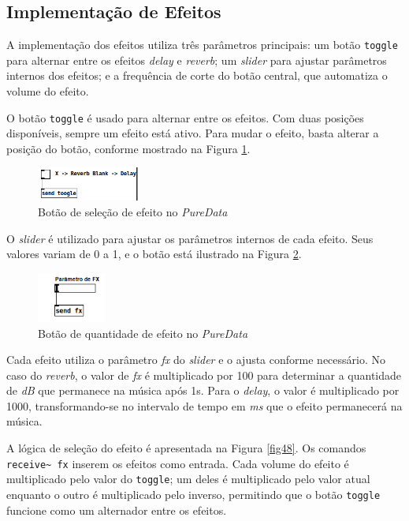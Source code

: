 \subsection{Implementação de Efeitos}

A implementação dos efeitos utiliza três parâmetros principais: um botão \texttt{toggle} para alternar entre os efeitos \textit{delay} e \textit{reverb}; um \textit{slider} para ajustar parâmetros internos dos efeitos; e a frequência de corte do botão central, que automatiza o volume do efeito.

O botão \texttt{toggle} é usado para alternar entre os efeitos. Com duas posições disponíveis, sempre um efeito está ativo. Para mudar o efeito, basta alterar a posição do botão, conforme mostrado na Figura \ref{fig46}.

\begin{figure}[h]
    \centering
    \includegraphics[width=0.3\textwidth]{figuras/fig46.png}
    \caption{Botão de seleção de efeito no \textit{PureData}}
    \label{fig46}
\end{figure}

O \textit{slider} é utilizado para ajustar os parâmetros internos de cada efeito. Seus valores variam de 0 a 1, e o botão está ilustrado na Figura \ref{fig47}.

\begin{figure}[h]
    \centering
    \includegraphics[width=0.2\textwidth]{figuras/fig47.png}
    \caption{Botão de quantidade de efeito no \textit{PureData}}
    \label{fig47}
\end{figure}

Cada efeito utiliza o parâmetro \textit{fx} do \textit{slider} e o ajusta conforme necessário. No caso do \textit{reverb}, o valor de \textit{fx} é multiplicado por 100 para determinar a quantidade de \textit{dB} que permanece na música após 1s. Para o \textit{delay}, o valor é multiplicado por 1000, transformando-se no intervalo de tempo em \textit{ms} que o efeito permanecerá na música.

A lógica de seleção do efeito é apresentada na Figura \ref{fig48}. Os comandos \texttt{receive\textasciitilde\ fx} inserem os efeitos como entrada. Cada volume do efeito é multiplicado pelo valor do \texttt{toggle}; um deles é multiplicado pelo valor atual enquanto o outro é multiplicado pelo inverso, permitindo que o botão \texttt{toggle} funcione como um alternador entre os efeitos.

